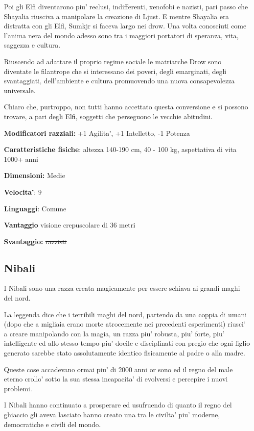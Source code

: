 \documentclass[a4paper,11pt,twoside,openany]{dndbook}
\begin{document}
Poi gli Elfi diventarono piu' reclusi, indifferenti, xenofobi e nazisti, pari passo che Shayalia riusciva a manipolare la creazione di Ljust. E mentre Shayalia era distratta con gli Elfi, Sumkjr si faceva largo nei drow. Una volta conosciuti come l'anima nera del mondo adesso sono tra i maggiori portatori di speranza, vita, saggezza e cultura.

Riuscendo ad adattare il proprio regime sociale le matriarche Drow sono diventate le filantrope che si interessano dei poveri, degli emarginati, degli svantaggiati, dell'ambiente e cultura promuovendo una nuova consapevolezza universale.

Chiaro che, purtroppo, non tutti hanno accettato questa conversione e si possono trovare, a pari degli Elfi, soggetti che perseguono le vecchie abitudini.

\textbf{Modificatori razziali:} +1 Agilita', +1 Intelletto, -1 Potenza

\textbf{Caratteristiche fisiche}: altezza 140-190 cm, 40 - 100 kg,
aspettativa di vita 1000+ anni

\textbf{Dimensioni:} Medie

\textbf{Velocita'}: 9

\textbf{Linguaggi}: Comune

\textbf{Vantaggio} visione crepuscolare di 36 metri

\textbf{Svantaggio:} \sout{razzisti}

\subsection{Nibali}

\label{nibali}

I Nibali sono una razza creata magicamente per essere schiava ai grandi maghi del nord.

La leggenda dice che i terribili maghi del nord, partendo da una coppia di umani (dopo che a migliaia erano morte atrocemente nei precedenti esperimenti) riusci' a creare manipolando con la magia, un razza piu' robusta, piu' forte, piu' intelligente ed allo stesso tempo piu' docile e disciplinati con pregio che ogni figlio generato sarebbe stato assolutamente identico fisicamente al padre o alla madre.

Queste cose accadevano ormai piu' di 2000 anni or sono ed il regno del male eterno crollo' sotto la sua stessa incapacita' di evolversi e percepire i nuovi problemi.

I Nibali hanno continuato a prosperare ed usufruendo di quanto il regno del ghiaccio gli aveva lasciato hanno creato una tra le civilta' piu' moderne, democratiche e civili del mondo.
\end{document}
